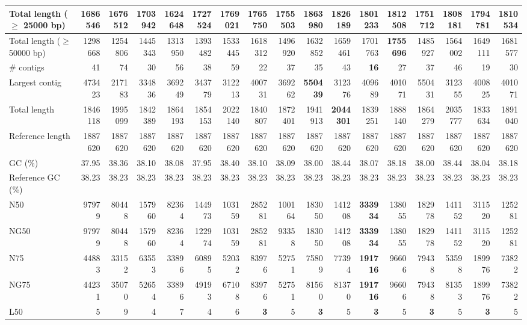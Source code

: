 \documentclass[12pt,a4paper]{article}
\begin{document}
\begin{table}[ht]
\begin{center}
\begin{tabular}{|l*{16}{|r}|}
Total length ($\geq$ 25000 bp) & 1686546 & 1676512 & 1703942 & 1624648 & 1727524 & 1769021 & 1765750 & 1755503 & {\bf 1863980} & 1826189 & 1801233 & 1812508 & 1751712 & 1808181 & 1794781 & 1810534 \\ \hline
Total length ($\geq$ 50000 bp) & 1298668 & 1254806 & 1445343 & 1313950 & 1393482 & 1533445 & 1618312 & 1496920 & 1632852 & 1659461 & 1701763 & {\bf 1755696} & 1485927 & 1564002 & 1649111 & 1681577 \\ \hline
\# contigs & 41 & 74 & 30 & 56 & 38 & 59 & 22 & 37 & 35 & 43 & {\bf 16} & 27 & 37 & 46 & 19 & 30 \\ \hline
Largest contig & 473423 & 217183 & 334836 & 369249 & 343779 & 312213 & 400731 & 369262 & {\bf 550439} & 312376 & 409689 & 401071 & 550431 & 312355 & 400825 & 401071 \\ \hline
Total length & 1846118 & 1995099 & 1842389 & 1864193 & 1854153 & 2022140 & 1840807 & 1872401 & 1941913 & {\bf 2044301} & 1839251 & 1888140 & 1864279 & 2035777 & 1833634 & 1891040 \\ \hline
Reference length & 1887620 & 1887620 & 1887620 & 1887620 & 1887620 & 1887620 & 1887620 & 1887620 & 1887620 & 1887620 & 1887620 & 1887620 & 1887620 & 1887620 & 1887620 & 1887620 \\ \hline
GC (\%) & 37.95 & 38.36 & 38.10 & 38.08 & 37.95 & 38.40 & 38.10 & 38.09 & 38.00 & 38.44 & 38.07 & 38.18 & 38.00 & 38.44 & 38.04 & 38.18 \\ \hline
Reference GC (\%) & 38.23 & 38.23 & 38.23 & 38.23 & 38.23 & 38.23 & 38.23 & 38.23 & 38.23 & 38.23 & 38.23 & 38.23 & 38.23 & 38.23 & 38.23 & 38.23 \\ \hline
N50 & 97979 & 80448 & 157960 & 82364 & 144973 & 103159 & 285281 & 100164 & 183050 & 141208 & {\bf 333934} & 138055 & 182978 & 141152 & 311520 & 125281 \\ \hline
NG50 & 97979 & 80448 & 157960 & 82364 & 122974 & 103159 & 285281 & 93358 & 183050 & 141208 & {\bf 333934} & 138055 & 182978 & 141152 & 311520 & 125281 \\ \hline
N75 & 44883 & 33152 & 63553 & 33896 & 60895 & 52032 & 83976 & 52751 & 75809 & 77394 & {\bf 191716} & 96606 & 79438 & 53598 & 189976 & 73822 \\ \hline
NG75 & 44231 & 35070 & 52654 & 33896 & 49193 & 67108 & 83976 & 52751 & 81560 & 81370 & {\bf 191716} & 96606 & 79438 & 81353 & 189976 & 73822 \\ \hline
L50 & 5 & 9 & 4 & 7 & 4 & 6 & {\bf 3} & 5 & {\bf 3} & 5 & {\bf 3} & 5 & {\bf 3} & 5 & {\bf 3} & 5 \\ \hline

\end{tabular}
\end{center}
\end{table}
\end{document}
